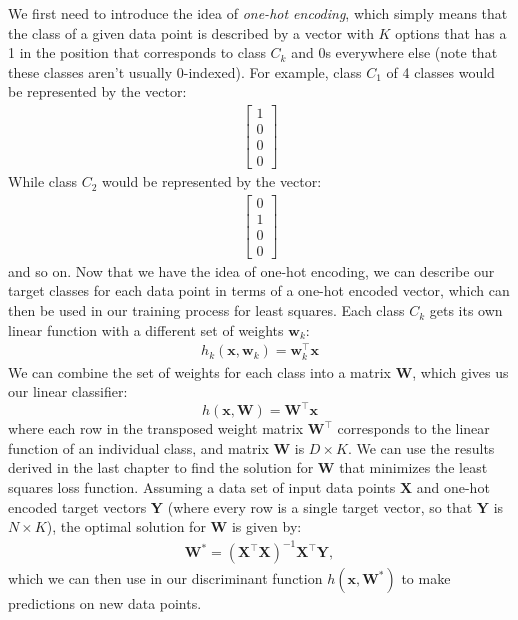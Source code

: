 We first need to introduce the idea of \textit{one-hot encoding}, which simply means that the class of a given data point is described by a vector with $K$ options that has a 1 in the position that corresponds to class $C_{k}$ and 0s everywhere else (note that these classes aren't usually 0-indexed). For example, class $C_{1}$ of 4 classes would be represented by the vector:
\begin{align}
    \begin{bmatrix}
    	1 \\
        0 \\
        0 \\
        0
    \end{bmatrix}
\end{align}
While class $C_{2}$ would be represented by the vector:
\begin{align}
    \begin{bmatrix}
    	0 \\
        1 \\
        0 \\
        0
    \end{bmatrix}
\end{align}
and so on. Now that we have the idea of one-hot encoding, we can describe our target classes for each data point in terms of a one-hot encoded vector, which can then be used in our training process for least squares. \newline \newline
Each class $C_{k}$ gets its own linear function with a different set of weights $\textbf{w}_{k}$:
\begin{align*}
	h_{k}(\textbf{x}, \textbf{w}_{k}) = \textbf{w}_{k}^\top\textbf{x}
\end{align*}
We can combine the set of weights for each class into a matrix $\textbf{W}$, which gives us our linear classifier:
\begin{equation}
	h(\textbf{x}, \textbf{W}) = \textbf{W}^\top\textbf{x}
\end{equation}
where each row in the transposed weight matrix $\textbf{W}^\top$ corresponds to the linear function of an individual class, and matrix $\textbf{W}$ is $D\times K$. We can use the results derived in the last chapter to find the solution for \textbf{W} that minimizes the least squares loss function. Assuming a data set of input data points $\textbf{X}$ and one-hot encoded target vectors \textbf{Y} (where every row is a single target vector, so that \textbf{Y} is $N\times K$), the optimal solution for \textbf{W} is given by:
\begin{align*}
	\textbf{W}^{*} = (\textbf{X}^\top\textbf{X})^{-1}\textbf{X}^\top\textbf{Y},
\end{align*}
which we can then use in our discriminant function $h(\textbf{x}, \textbf{W}^{*})$ to make predictions on new data points.

